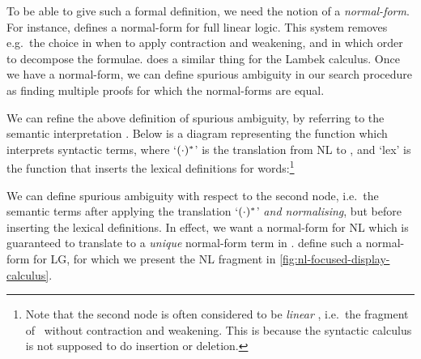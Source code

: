 To be able to give such a formal definition, we need the notion of a
\emph{normal-form}. For instance, \citet{andreoli1992} defines a
normal-form for full linear logic. This system removes e.g.\ the
choice in when to apply contraction and weakening, and in which order
to decompose the formulae. \citet{hepple1990} does a similar thing for
the Lambek calculus. Once we have a normal-form, we can define
spurious ambiguity in our search procedure as finding multiple proofs
for which the normal-forms are equal.

We can refine the above definition of spurious ambiguity, by referring
to the semantic interpretation \citep{capelletti2007,bastenhof2013}.
Below is a diagram representing the function which interprets
syntactic terms, where `$({\cdot})^*$' is the translation from NL to \lamPET,
and `lex' is the function that inserts the lexical definitions for
words:\footnote{%
  Note that the second node is often considered to be \emph{linear}
  \lamET, i.e.\ the fragment of \lamET\ without contraction and
  weakening. This is because the syntactic calculus is not supposed
  to do insertion or deletion. 
}
\begin{center}
\end{center}
We can define spurious ambiguity with respect to the second node,
i.e.\ the semantic terms after applying the translation `$({\cdot})^*$'
\emph{and normalising}, but before inserting the lexical definitions.
In effect, we want a normal-form for NL which is guaranteed to
translate to a \emph{unique} normal-form term in \lamET.
\citet{moortgat2012} define such a normal-form for LG, for which we
present the NL fragment in \autoref{fig:nl-focused-display-calculus}.



